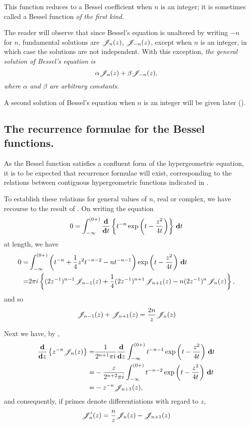 \documentclass{book}
\begin{document}
This function reduces to a Bessel coefficient when $n$ is an integer;
it is sometimes called a Bessel function \emph{of the first kind}.

The reader will observe that since Bessel's equation is unaltered by
writing $-n$ for $n$, fundamental solutions are $\mathscr{J}_n(z)$, $\mathscr{J}_{-n}(z)$,
except when $n$ is an integer, in which case the solutions are not
independent. With this exception, \emph{the general solution of
  Bessel's equation is
  $$
  \alpha \mathscr{J}_n(z) + \beta \mathscr{J}_{-n}(z),
  $$
  where $\alpha$ and $\beta$ are arbitrary constants.}

A second solution of Bessel's equation when $n$ is an integer will be
given later ().

\subsection{The recurrence formulae for the Bessel functions.}
As the Bessel function satisfies a confluent form of the
hypergeometric equation, it is to be expected that recurrence formulae
will exist, corresponding to the relations between contiguous
hypergeometric functions indicated in .

To establish these relations for general values of $n$, real or
complex, we have recourse to the result of .
On writing the equation
$$
0 = \int_{-\infty}^{(0+)} \frac{\mathbf{d}}{\mathbf{d} t} \left\{  t^{-n}
  \exp\left(  t - \frac{z^2}{4t}   \right)   \right\} \, \mathbf{d} t
$$
at length, we have
\begin{align*}
  0 =& \int_{-\infty}^{(0+)}
  \left(  t^{-n} + \frac{1}{4}z^2 t^{-n-2} - nt^{-n-1}   \right)
  \exp\left(  t - \frac{z^2}{4t}   \right)  \, \mathbf{d} t \\
  =& 2\pi i
  \left\{  (2z^{-1})^{n-1} \mathscr{J}_{n-1}(z)
    + \frac{1}{4} (2z^{-1})^{n+1} \mathscr{J}_{n+1}(z)
    - n (2z^{-1})^n \mathscr{J}_n(z) \right\},
\end{align*}
and so
\begin{equation}
  \mathscr{J}_{n-1}(z) + \mathscr{J}_{n+1}(z) = \frac{2n}{z} \mathscr{J}_n(z) 
  \label{eq:bessel:recur}
\end{equation}

Next we have, by ,
\begin{align*}
  \frac{\mathbf{d}}{\mathbf{d} z} \left\{  z^{-n} \mathscr{J}_n(z)   \right\}
  =& \frac{1}{2^{n+1}\pi i}
  \frac{\mathbf{d}}{\mathbf{d} z}
  \int_{-\infty}^{(0+)}
  t^{-n-1}
  \exp\left(  t - \frac{z^2}{4t}  \right)
  \, \mathbf{d} t
  \\
  =& - \frac{z}{2^{n+2}\pi i}
  \int_{-\infty}^{(0+)}
  t^{-n-2}
  \exp\left(  t - \frac{z^2}{4t}  \right)
  \, \mathbf{d} t
  \\
  =& -z^{-n} \mathscr{J}_{n+1}(z),  
\end{align*}
% 
% 
and consequently, if primes denote differentiations with regard to
$z$,
\begin{equation}
  \mathscr{J}'_n(z) = \frac{n}{z} \mathscr{J}_n(z) - \mathscr{J}_{n+1}(z)
  \label{eq:bessel:deriv}
\end{equation}
\end{document}
